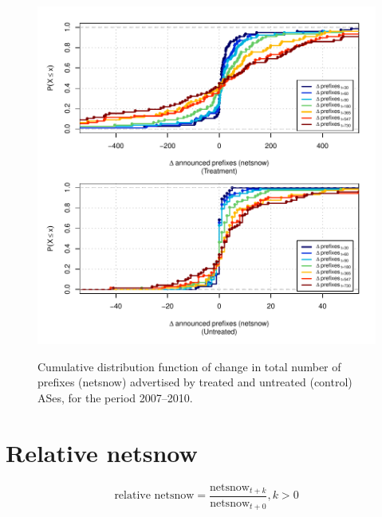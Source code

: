 \begin{figure}[H]
\begin{centering}
\begin{singlespace}
    \includegraphics[width=6in]{figures/behavior-netsnow-2007_2010-corr.pdf}
    \vspace{-2em}\\
    \caption{Cumulative distribution function of change in total number of
    prefixes (netsnow) advertised by treated and untreated (control) ASes, for
    the period 2007--2010.}
\end{singlespace}
\end{centering}
\end{figure}

\section{Relative netsnow}

\[
\textrm{relative netsnow} = \frac{\textrm{netsnow}_{t+k}}
                                 {\textrm{netsnow}_{t+0}}, k > 0
\]

